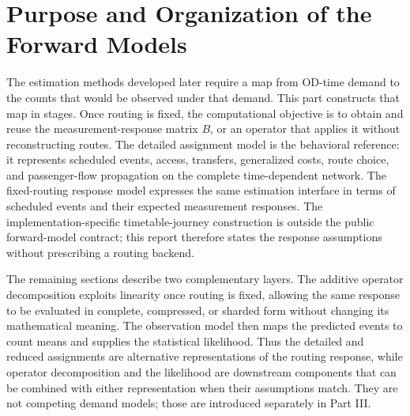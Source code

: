 \section*{Purpose and Organization of the Forward Models}

The estimation methods developed later require a map from OD-time demand to
the counts that would be observed under that demand. This part constructs that
map in stages. Once routing is fixed, the computational objective is to obtain
and reuse the measurement-response matrix $B$, or an operator that applies it
without reconstructing routes. The detailed assignment model is the behavioral reference: it
represents scheduled events, access, transfers, generalized costs, route
choice, and passenger-flow propagation on the complete time-dependent network.
The fixed-routing response model expresses the same estimation interface in
terms of scheduled events and their expected measurement responses. The
implementation-specific timetable-journey construction is outside the public
forward-model contract; this report therefore states the response assumptions
without prescribing a routing backend.

The remaining sections describe two complementary layers. The additive
operator decomposition exploits linearity once routing is fixed, allowing the
same response to be evaluated in complete, compressed, or sharded form without
changing its mathematical meaning. The observation model then maps the
predicted events to count means and supplies the statistical likelihood. Thus
the detailed and reduced assignments are alternative representations of the
routing response, while operator decomposition and the likelihood are
downstream components that can be combined with either representation when
their assumptions match. They are not competing demand models; those are
introduced separately in Part III.
